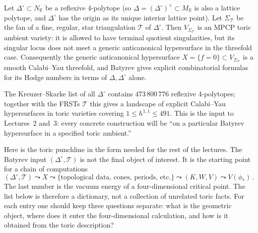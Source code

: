 \begin{theorem}\label{thm:batyrev}
Let $\Delta^\circ\subset N_\mathbb{R}$ be a reflexive $4$-polytope
(so $\Delta = (\Delta^\circ)^\vee \subset M_\mathbb{R}$ is also a
lattice polytope, and $\Delta^\circ$ has the origin as its unique
interior lattice point). Let $\Sigma_{\mathcal{T}}$ be the fan of a
fine, regular, star triangulation $\mathcal{T}$ of $\Delta^\circ$.
Then $V_{\Sigma_{\mathcal{T}}}$ is an MPCP toric ambient variety:
it is allowed to have terminal quotient singularities, but its
singular locus does not meet a generic anticanonical hypersurface in
the threefold case. Consequently the generic anticanonical
hypersurface
$X = \{f=0\}\subset V_{\Sigma_{\mathcal{T}}}$ is a smooth
Calabi--Yau threefold, and Batyrev gives explicit combinatorial
formulas for its Hodge numbers in terms of $\Delta,\Delta^\circ$
alone.
\end{theorem}

The Kreuzer--Skarke list \cite{Kreuzer:2000xy} of all $\Delta^\circ$
contains $473\,800\,776$ reflexive 4-polytopes; together with the
FRSTs $\mathcal{T}$ this gives a landscape of explicit Calabi--Yau
hypersurfaces in toric varieties covering
$1\leq h^{1,1}\leq 491$. This is the input to Lectures~2 and~3:
every concrete construction will be ``on a particular Batyrev
hypersurface in a specified toric ambient.''

Here is the toric punchline in the form needed for the rest of the
lectures. The Batyrev input $(\Delta^\circ,\mathcal{T})$ is not
the final object of interest. It is the starting point for a chain of
computations
\begin{equation}
    (\Delta^\circ,\mathcal{T})
    \leadsto X
    \leadsto
    \{\text{topological data, cones, periods, etc.}\}
    \leadsto
    (K,W,V)
    \leadsto
    V(\phi_*) \, .
\end{equation}
The last number is the vacuum energy of a four-dimensional critical
point. The list below is therefore a dictionary, not a collection of
unrelated toric facts. For each entry one should keep three questions
separate: what is the geometric object, where does it enter the
four-dimensional calculation, and how is it obtained from the toric
description?

